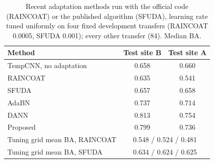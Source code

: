 \begin{table}[!t]
\caption{Recent adaptation methods run with the official code (RAINCOAT) or the published algorithm (SFUDA), learning rate tuned uniformly on four fixed development transfers (RAINCOAT 0.0005, SFUDA 0.001); every other transfer (84). Median BA.}
\label{tab:s_recent}
\centering\footnotesize
\begin{tabular}{@{}lcc@{}}
\toprule
Method & Test site B & Test site A\\
\midrule
TempCNN, no adaptation & 0.658 & 0.660\\
RAINCOAT \cite{He2023} & 0.635 & 0.541\\
SFUDA \cite{Mohammadi2024} & 0.657 & 0.658\\
AdaBN & 0.737 & 0.714\\
DANN & 0.813 & 0.754\\
Proposed & 0.799 & 0.736\\
\midrule
Tuning grid mean BA, RAINCOAT & \multicolumn{2}{c}{0.548 / 0.524 / 0.481}\\
Tuning grid mean BA, SFUDA & \multicolumn{2}{c}{0.634 / 0.624 / 0.625}\\
\bottomrule
\end{tabular}
\end{table}